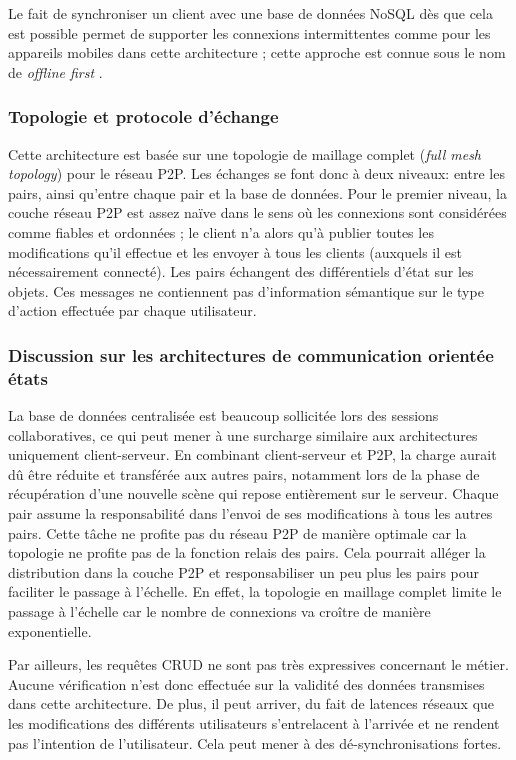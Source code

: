 Le fait de synchroniser un client avec une base de données NoSQL dès que cela 
est possible permet de supporter les connexions intermittentes comme pour les 
appareils mobiles dans cette architecture ; cette approche est connue sous le nom 
de \og\textit{offline first}\fg{} \cite{Gadea2016}.
\subsubsection{Topologie et protocole d'échange}
Cette architecture est basée sur une topologie de maillage complet (\textit{full 
mesh topology}) pour le réseau \gls{P2P}.
Les échanges se font donc à deux niveaux: entre les pairs, ainsi qu'entre chaque 
pair et la base de données. Pour le premier niveau, la couche réseau \gls{P2P} est 
assez 
naïve dans le sens où les connexions sont considérées comme fiables et 
ordonnées ; le client n'a alors qu'à publier toutes les modifications qu'il effectue et 
les envoyer à tous les clients (auxquels il est nécessairement connecté).
Les pairs échangent des différentiels d'état sur les objets. Ces messages ne 
contiennent pas d'information sémantique sur le type d'action effectuée par chaque 
utilisateur. 

\subsubsection{Discussion sur les architectures de 
communication orientée \og états\fg{}}

La base de données centralisée est beaucoup sollicitée lors des sessions 
collaboratives, ce qui peut mener à une surcharge similaire aux architectures 
uniquement client-serveur. 
En combinant client-serveur et \gls{P2P}, la charge aurait dû être réduite et 
transférée aux autres pairs, notamment lors de la phase de récupération d'une 
nouvelle scène qui repose entièrement sur le serveur. 
Chaque pair assume la responsabilité dans l'envoi de ses modifications à tous les 
autres pairs. Cette tâche ne profite pas du réseau \gls{P2P} de manière optimale 
car la topologie ne profite pas de la fonction relais des pairs. Cela pourrait alléger  
la distribution dans la couche \gls{P2P} et responsabiliser un peu plus les pairs 
pour faciliter le passage à l'échelle.
En effet, la topologie en maillage complet limite le passage à l'échelle car le 
nombre de connexions va croître de manière exponentielle. 

Par ailleurs, les requêtes \gls{CRUD} ne sont pas très expressives concernant le 
métier. 
Aucune vérification n'est donc effectuée sur la validité des données transmises 
dans cette architecture. De plus, il peut arriver, du fait de latences réseaux que les 
modifications des différents utilisateurs s'entrelacent à l'arrivée et ne rendent pas 
l'intention de l'utilisateur. Cela peut mener à des dé-synchronisations fortes.


